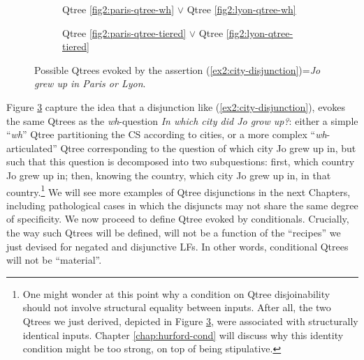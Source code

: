 \begin{figure}[H]
	\centering
	\begin{subfigure}[t]{.45\linewidth}
		\centering
		\caption{Qtree \ref{fig2:paris-qtree-wh} $\vee$ Qtree \ref{fig2:lyon-qtree-wh}}\label{fig2:paris-or-lyon-qtree-wh}
	\end{subfigure}
	\hfill
	\begin{subfigure}[t]{.45\linewidth}
		\centering{}
		\caption{Qtree \ref{fig2:paris-qtree-tiered} $\vee$ Qtree \ref{fig2:lyon-qtree-tiered}}\label{fig2:paris-or-lyon-qtree-tiered}
	\end{subfigure}
	\caption{Possible Qtrees evoked by the assertion (\ref{ex2:city-disjunction})=\textit{Jo grew up in Paris or Lyon}.}\label{fig2:paris-or-lyon-qtrees}
\end{figure}

Figure \ref{fig2:paris-or-lyon-qtrees} capture the idea that a disjunction like (\ref{ex2:city-disjunction}), evokes the same Qtrees as the \textit{wh}-question \textit{In which city did Jo grow up?}: either a simple ``\textit{wh}'' Qtree partitioning the CS according to cities, or a more complex ``\textit{wh}-articulated'' Qtree corresponding to the question of which city Jo grew up in, but such that this question is decomposed into two subquestions: first, which country Jo grew up in; then, knowing the country, which city Jo grew up in, in that country.\footnote{One might wonder at this point why a condition on Qtree disjoinability should not involve structural equality between inputs. After all, the two Qtrees we just derived, depicted in Figure \ref{fig2:paris-or-lyon-qtrees}, were associated with structurally identical inputs. Chapter \ref{chap:hurford-cond} will discuss why this identity condition might be too strong, on top of being stipulative.} We will see more examples of Qtree disjunctions in the next Chapters, including pathological cases in which the disjuncts may not share the same degree of specificity. We now proceed to define Qtree evoked by conditionals. Crucially, the way such Qtrees will be defined, will not be a function of the ``recipes'' we just devised for negated and disjunctive LFs. In other words, conditional Qtrees will not be ``material''.


